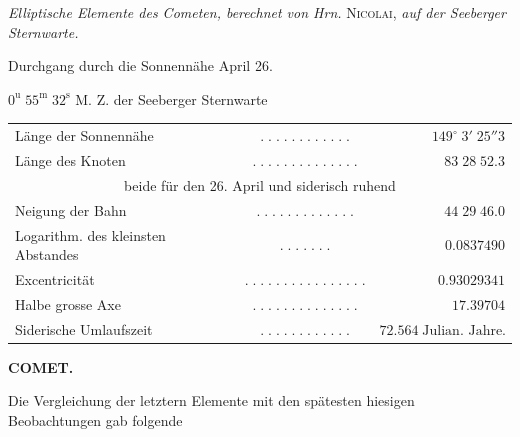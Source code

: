 \begin{center}
\emph{Elliptische Elemente des Cometen, berechnet von Hrn.} \textsc{Nicolai}, \emph{auf der Seeberger Sternwarte.}
\end{center}

\begin{center}\fontsize{10}{12}\selectfont Durchgang durch die Sonnennähe April 26.\par $0^{\mathrm u}\;55^{\mathrm m}\;32^{\mathrm s}$ M. Z. der Seeberger Sternwarte\end{center}
\begin{center}\fontsize{9}{11}\selectfont\setlength{\tabcolsep}{2pt}\renewcommand{\arraystretch}{1.15}\begin{tabular}{lcr}
Länge der Sonnennähe & $.\;.\;.\;.\;.\;.\;.\;.\;.\;.\;.\;.$ & $149^\circ\;3'\;25''3$\\
Länge des Knoten & $.\;.\;.\;.\;.\;.\;.\;.\;.\;.\;.\;.\;.\;.$ & $83\;28\;52.3$\\
\multicolumn{3}{c}{beide für den 26. April und siderisch ruhend}\\
Neigung der Bahn & $.\;.\;.\;.\;.\;.\;.\;.\;.\;.\;.\;.\;.$ & $44\;29\;46.0$\\
Logarithm. des kleinsten Abstandes & $.\;.\;.\;.\;.\;.\;.$ & $0.0837490$\\
Excentricität & $.\;.\;.\;.\;.\;.\;.\;.\;.\;.\;.\;.\;.\;.\;.\;.$ & $0.93029341$\\
Halbe grosse Axe & $.\;.\;.\;.\;.\;.\;.\;.\;.\;.\;.\;.\;.\;.$ & $17.39704$\\
Siderische Umlaufszeit & $.\;.\;.\;.\;.\;.\;.\;.\;.\;.\;.\;.$ & $72.564\;\text{Julian. Jahre.}$\\
\end{tabular}\end{center}

\clearpage
\thispagestyle{empty}
\noindent{}%
\makebox[12mm][l]{}%
\parbox[t]{\dimexpr\linewidth-24mm\relax}{\centering\footnotesize\bfseries COMET.\par}%
\par\nobreak\medskip
\begingroup\setlength{\rightskip}{0pt plus 1em}\par\indent Die Vergleichung der letztern Elemente mit den spätesten hiesigen Beobachtungen gab folgende\par\endgroup

